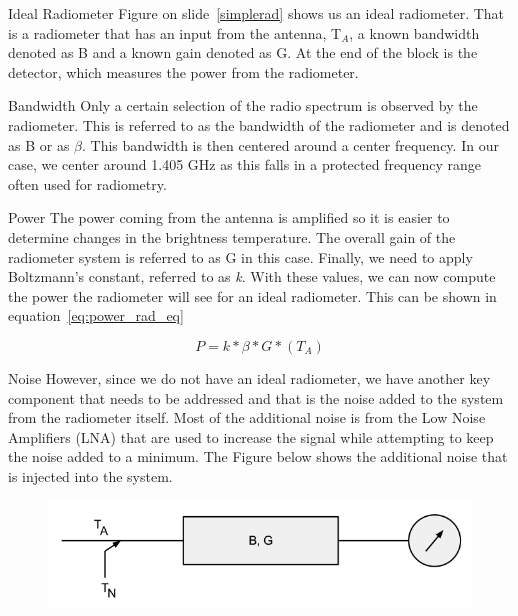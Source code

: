 \documentclass{beamer}
\begin{document}
\begin{frame}
\begin{block}{Ideal Radiometer}
Figure on slide~\ref{simplerad} shows us an ideal radiometer.  That is a radiometer that has an input from the antenna, T$_{A}$, a known bandwidth denoted as B and a known gain denoted as G.  At the end of the block is the detector, which measures the power from the radiometer.
\end{block}
\end{frame}

\begin{frame}
\begin{block}{Bandwidth}
Only a certain selection of the radio spectrum is observed by the radiometer.  This is referred to as the bandwidth of the radiometer and is denoted as B or as $\beta$.  This bandwidth is then centered around a center frequency.  In our case, we center around 1.405 GHz as this falls in a protected frequency range often used for radiometry.  
\end{block}
\end{frame}

\begin{frame}
\begin{block}{Power}
The power coming from the antenna is amplified so it is easier to determine changes in the brightness temperature.  The overall gain of the radiometer system is referred to as G in this case.  Finally, we need to apply Boltzmann's constant, referred to as \textit{k}.  With these values, we can now compute the power the radiometer will see for an ideal radiometer.  This can be shown in equation~\ref{eq:power_rad_eq}

\begin{equation} \label{eq:power_rad_eq}
P=k*\beta*G*(T_{A})
\end{equation}
\end{block}

\end{frame}

\begin{frame}
\begin{block}{Noise}
However, since we do not have an ideal radiometer, we have another key component that needs to be addressed and that is the noise added to the system from the radiometer itself.  Most of the additional noise is from the Low Noise Amplifiers (LNA) that are used to increase the signal while attempting to keep the noise added to a minimum.  The Figure below shows the additional noise that is injected into the system.

{\begin{figure}[h!tb] 
\centering
\includegraphics[width=\textwidth]{../Images/radiometer_noise_added.png}
\label{noiserad}
\end{figure}
}
\end{block}
\end{frame}
\end{document}
